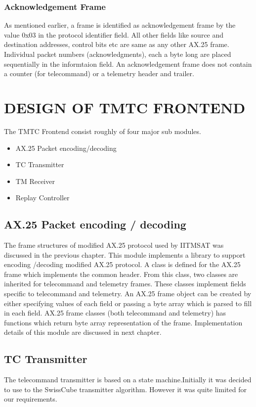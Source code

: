 \documentclass[BTech]{iitmdiss}
\begin{document}
\subsection{Acknowledgement Frame }
As mentioned earlier, a frame is identified as acknowledgement frame by the value 0x03 in the protocol identifier field. All other fields like source and destination addresses, control bits etc are same as any other AX.25 frame. Individual packet numbers (acknowledgments), each a byte long are placed sequentially in the informtaion field. An acknowledgement frame does not contain a counter (for telecommand) or a telemetry header and trailer.

 \chapter{DESIGN OF TMTC FRONTEND}
 \label{chap:design}
 The TMTC Frontend consist roughly of four major sub modules.
\begin{itemize}
\item AX.25 Packet encoding/decoding
\item TC Transmitter
\item TM Receiver
\item Replay Controller
\end{itemize}
\section{AX.25 Packet encoding / decoding }
The frame structures of modified AX.25 protocol used by IITMSAT was discussed in the previous chapter.
This module implements a library to support encoding /decoding modified AX.25 protocol. A class is defined for the AX.25 frame which implements the common header. From this class, two classes are inherited for telecommand and telemetry frames. These classes implement fields specific to telecommand and telemetry. An AX.25 frame object can be created by either specifying values of each field or passing a byte array which is parsed to fill in each field. AX.25 frame classes (both telecommand and telemetry) has functions which return byte array representation of the frame. Implementation details of this module are discussed in next chapter. 

\section{TC Transmitter}
The telecommand transmitter is based on a state machine.Initially it was decided to use to the SwissCube transmitter algorithm. However it was quite limited for our requirements.
\end{document}
